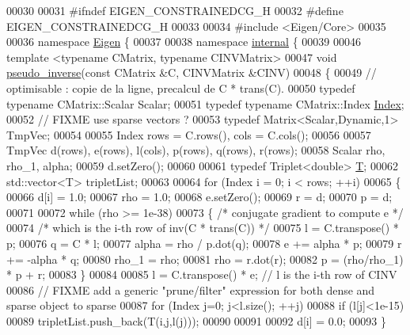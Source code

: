 \begin{DoxyCode}
00030 
00031 \textcolor{preprocessor}{#ifndef EIGEN\_CONSTRAINEDCG\_H}
00032 \textcolor{preprocessor}{#define EIGEN\_CONSTRAINEDCG\_H}
00033 
00034 \textcolor{preprocessor}{#include <Eigen/Core>}
00035 
00036 \textcolor{keyword}{namespace }\hyperlink{namespace_eigen}{Eigen} \{ 
00037 
00038 \textcolor{keyword}{namespace }\hyperlink{namespaceinternal}{internal} \{
00039 
00046 \textcolor{keyword}{template} <\textcolor{keyword}{typename} CMatrix, \textcolor{keyword}{typename} CINVMatrix>
00047 \textcolor{keywordtype}{void} \hyperlink{namespace_eigen_1_1internal_a58a0ccf0e71d88beeb5dcf72ed0bdd5f}{pseudo\_inverse}(\textcolor{keyword}{const} CMatrix &C, CINVMatrix &CINV)
00048 \{
00049   \textcolor{comment}{// optimisable : copie de la ligne, precalcul de C * trans(C).}
00050   \textcolor{keyword}{typedef} \textcolor{keyword}{typename} CMatrix::Scalar Scalar;
00051   \textcolor{keyword}{typedef} \textcolor{keyword}{typename} CMatrix::Index \hyperlink{namespace_eigen_a62e77e0933482dafde8fe197d9a2cfde}{Index};
00052   \textcolor{comment}{// FIXME use sparse vectors ?}
00053   \textcolor{keyword}{typedef} Matrix<Scalar,Dynamic,1> TmpVec;
00054 
00055   Index rows = C.rows(), cols = C.cols();
00056 
00057   TmpVec d(rows), e(rows), l(cols), p(rows), q(rows), r(rows);
00058   Scalar rho, rho\_1, alpha;
00059   d.setZero();
00060 
00061   \textcolor{keyword}{typedef} Triplet<double> \hyperlink{group___sparse_core___module_class_eigen_1_1_triplet}{T};
00062   std::vector<T> tripletList;
00063     
00064   \textcolor{keywordflow}{for} (Index i = 0; i < rows; ++i)
00065   \{
00066     d[i] = 1.0;
00067     rho = 1.0;
00068     e.setZero();
00069     r = d;
00070     p = d;
00071 
00072     \textcolor{keywordflow}{while} (rho >= 1e-38)
00073     \{ \textcolor{comment}{/* conjugate gradient to compute e             */}
00074       \textcolor{comment}{/* which is the i-th row of inv(C * trans(C))  */}
00075       l = C.transpose() * p;
00076       q = C * l;
00077       alpha = rho / p.dot(q);
00078       e +=  alpha * p;
00079       r += -alpha * q;
00080       rho\_1 = rho;
00081       rho = r.dot(r);
00082       p = (rho/rho\_1) * p + r;
00083     \}
00084 
00085     l = C.transpose() * e; \textcolor{comment}{// l is the i-th row of CINV}
00086     \textcolor{comment}{// FIXME add a generic "prune/filter" expression for both dense and sparse object to sparse}
00087     \textcolor{keywordflow}{for} (Index j=0; j<l.size(); ++j)
00088       \textcolor{keywordflow}{if} (l[j]<1e-15)
00089     tripletList.push\_back(T(i,j,l(j)));
00090 
00091     
00092     d[i] = 0.0;
00093   \}

\end{DoxyCode}

